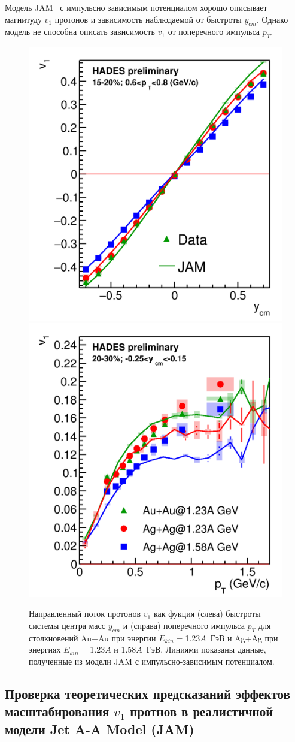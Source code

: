 Модель JAM~\cite{nara2019jam} с импульсно зависимым потенциалом хорошо описывает магнитуду $v_1$ протонов и зависимость наблюдаемой от быстроты $y_{cm}$.
Однако модель не способна описать зависимость $v_1$ от поперечного импульса $p_T$.
%
\begin{figure}[ht]
\begin{center}
\includegraphics[width=0.45\linewidth]{images/v1_hades_ycm.png}
\includegraphics[width=0.45\linewidth]{images/v1_hades_pT.png}
\caption{Направленный поток протонов $v_1$ как фукция (слева) быстроты системы центра масс $y_{cm}$ и (справа) поперечного импульса $p_T$ для столкновений Au+Au при энергии $E_{kin}=$1.23$A$~ГэВ и Ag+Ag при энергиях $E_{kin}=$1.23$A$ и 1.58$A$~ГэВ. Линиями показаны данные, полученные из модели JAM с импульсно-зависимым потенциалом.}
\label{fig:hades_v1_ycm_pT}
\end{center}
\end{figure}

\subsection{Проверка теоретических предсказаний эффектов масштабирования $v_1$ протнов в реалистичной модели Jet A-A Model (JAM)}

